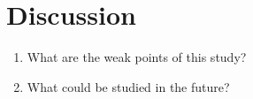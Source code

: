 \documentclass[english,12pt,a4paper,pdftex]{article}
\begin{document}

\clearpage

\section{Discussion}

\begin{enumerate}
\item What are the weak points of this study?
\item What could be studied in the future?
\end{enumerate}

\clearpage

\end{document}
